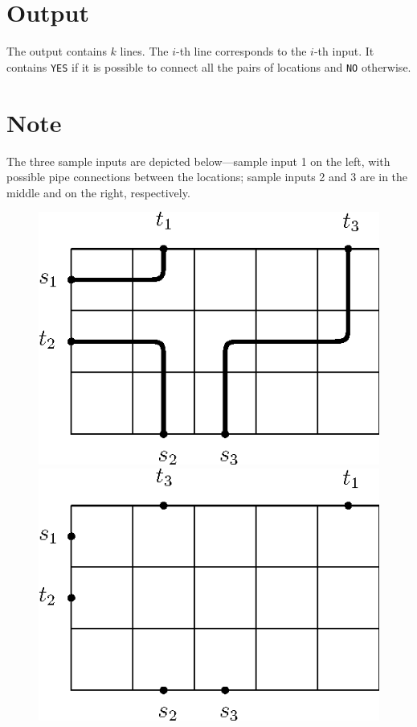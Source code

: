 \section*{Output}
The output contains $k$ lines. The $i$-th line corresponds to the $i$-th input.
It contains {\tt YES} if it is possible to connect all the pairs of locations and {\tt NO} otherwise.

\section*{Note}
The three sample inputs are depicted below---sample input 1 on the left, with possible pipe connections between the locations; sample inputs 2 and 3 are in the middle and on the right, respectively.
\begin{figure}[h]
  \includegraphics[scale=0.7]{pipes1} \hfill
  \includegraphics[scale=0.7]{pipes2} \hfill

\end{figure}
